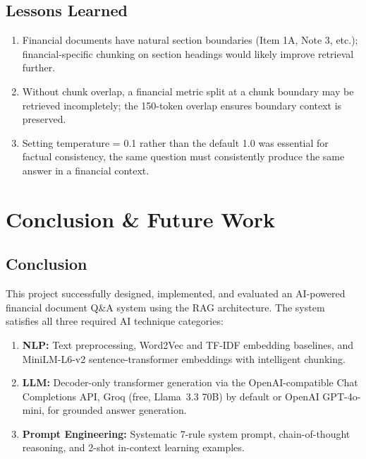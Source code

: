 \documentclass[12pt,a4paper]{article}
\begin{document}
\subsection{Lessons Learned}

\begin{enumerate}[leftmargin=*, noitemsep]
  \item Financial documents have natural section boundaries (Item 1A, Note 3, etc.); financial-specific chunking on section headings would likely improve retrieval further.
  \item Without chunk overlap, a financial metric split at a chunk boundary may be retrieved incompletely; the 150-token overlap ensures boundary context is preserved.
  \item Setting temperature = 0.1 rather than the default 1.0 was essential for factual consistency, the same question must consistently produce the same answer in a financial context.
\end{enumerate}

\section{Conclusion \& Future Work}

\subsection{Conclusion}

This project successfully designed, implemented, and evaluated an AI-powered financial document Q\&A system using the RAG architecture. The system satisfies all three required AI technique categories:

\begin{enumerate}[leftmargin=*, noitemsep]
  \item \textbf{NLP:} Text preprocessing, Word2Vec and TF-IDF embedding baselines, and MiniLM-L6-v2 sentence-transformer embeddings with intelligent chunking.
  \item \textbf{LLM:} Decoder-only transformer generation via the OpenAI-compatible Chat Completions API, Groq (free, Llama~3.3 70B) by default or OpenAI GPT-4o-mini, for grounded answer generation.
  \item \textbf{Prompt Engineering:} Systematic 7-rule system prompt, chain-of-thought reasoning, and 2-shot in-context learning examples.
\end{enumerate}
\end{document}
